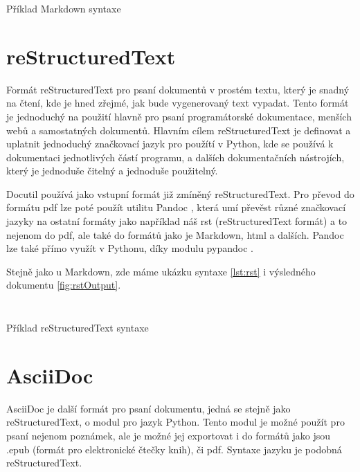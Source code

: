 \begin{listing}[ht]
    \inputminted[linenos,breaklines]{md}{example.md}
    \caption{Příklad Markdown syntaxe}
    \label{lst:markdown}
\end{listing}

\clearpage

\section{reStructuredText}

Formát reStructuredText pro psaní dokumentů v prostém textu, který je snadný na čtení, kde je hned zřejmé, jak bude vygenerovaný text vypadat.
Tento formát je jednoduchý na použití hlavně pro psaní programátorské dokumentace, menších webů a samostatných dokumentů.
Hlavním cílem reStructuredText je definovat a uplatnit jednoduchý značkovací jazyk pro použítí v Python, kde se používá k dokumentaci jednotlivých částí programu,
a dalších dokumentačních nástrojích, který je jednoduše čitelný a jednoduše použitelný. \cite{reStruDoc}

 \cite{docutil}
Docutil používá jako vstupní formát již zmíněný reStructuredText. Pro převod do formátu \gls{pdf} lze poté použít utilitu Pandoc \cite{pandocSW}, která umí převěst různé značkovací jazyky
na ostatní formáty jako například náš rst (reStructuredText formát) a to nejenom do \gls{pdf}, ale také do formátů jako je Markdown, \gls{html} a dalších.
Pandoc lze také přímo využít v Pythonu, díky modulu pypandoc \cite{pypandocSW}.

Stejně jako u Markdown, zde máme ukázku syntaxe \ref{lst:rst} i výsledného dokumentu \ref{fig:rstOutput}.

\begin{listing}[ht]
    \inputminted[linenos,breaklines]{rst}{example-rst.rst}
    \inputminted[linenos,breaklines]{rst}{module.rst}
    \caption{Příklad reStructuredText syntaxe}
    \label{lst:rst}
\end{listing}

\clearpage

\section{AsciiDoc}

AsciiDoc je další formát pro psaní dokumentu, jedná se stejně jako reStructuredText, o modul pro jazyk Python. Tento modul je možné použít pro psaní nejenom poznámek,
ale je možné jej exportovat i do formátů jako jsou .epub (formát pro elektronické čtečky knih), či \gls{pdf}. \cite{asciiDoc} Syntaxe jazyku je podobná reStructuredText.

